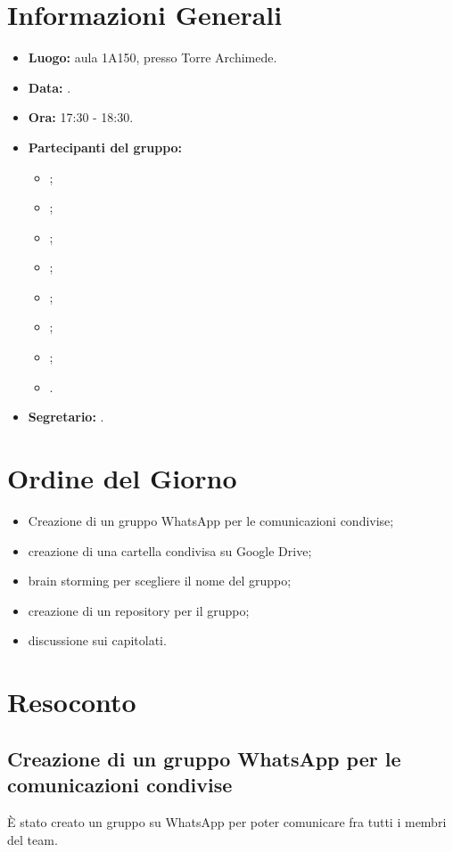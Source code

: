 \section{Informazioni Generali}
\begin{itemize}
\item \textbf{Luogo:} aula 1A150, presso Torre Archimede.
\item \textbf{Data:} \Data.
\item \textbf{Ora:} 17:30 - 18:30.
\item \textbf{Partecipanti del gruppo:}
	\begin{itemize}
		\item \AT; 
		\item \BR;
		\item \CE; 
		\item \DF;
		\item \LD;
		\item \MC;
		\item \PF;
		\item \SE.
	\end{itemize} 
\item \textbf{Segretario:} \AT.
\end{itemize}


\section{Ordine del Giorno}
\begin{itemize}
	\item Creazione di un gruppo WhatsApp per le comunicazioni condivise; 
	\item creazione di una cartella condivisa su Google Drive;
	\item brain storming per scegliere il nome del gruppo;
	\item creazione di un repository per il gruppo;
	\item discussione sui capitolati.
\end{itemize}

\section{Resoconto}
\subsection{Creazione di un gruppo WhatsApp per le comunicazioni condivise}
È stato creato un gruppo su WhatsApp per poter comunicare fra tutti i membri del team.

